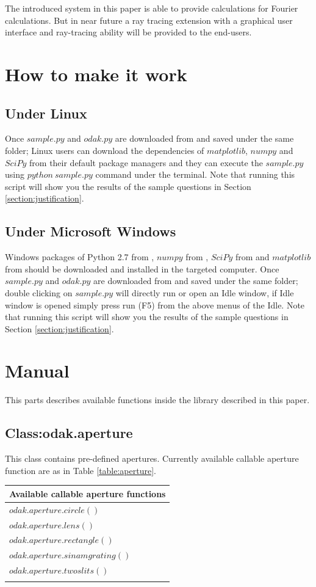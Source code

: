 \documentclass[journal,9pt]{IEEEtran}
\begin{document}
The introduced system in this paper is able to provide calculations for Fourier calculations. But in near future a ray tracing extension with a graphical user interface and ray-tracing ability will be provided to the end-users.

\section{How to make it work}
\label{section:howtomakeitwork}
\subsection{Under Linux}
Once $sample.py$ and $odak.py$ are downloaded from \cite{odak} and saved under the same folder; Linux users can download the dependencies of $matplotlib$, $numpy$ and $SciPy$ from their default package managers and they can execute the $sample.py$ using $python~sample.py$ command under the terminal. Note that running this script will show you the results of the sample questions in Section \ref{section:justification}.
\subsection{Under Microsoft Windows}
Windows packages of Python 2.7 from \cite{python}, $numpy$ from \cite{numpy}, $SciPy$ from \cite{scipy} and $matplotlib$ from \cite{matplotlib} should be downloaded and installed in the targeted computer. Once $sample.py$ and $odak.py$ are downloaded from \cite{odak} and saved under the same folder; double clicking on $sample.py$ will directly run or open an Idle window, if Idle window is opened simply press run (F5) from the above menus of the Idle. Note that running this script will show you the results of the sample questions in Section \ref{section:justification}.

\section{Manual}
\label{section:manual}

This parts describes available functions inside the library described in this paper.
\subsection{Class:odak.aperture}
This class contains pre-defined apertures. Currently available callable aperture function are as in Table \ref{table:aperture}.

\begin{tabular}{ l }
  \\Available callable aperture functions\\ \hline
  $odak.aperture.circle()$\\
  $odak.aperture.lens()$\\
  $odak.aperture.rectangle()$\\
  $odak.aperture.sinamgrating()$\\
  $odak.aperture.twoslits()$\\
\label{table:aperture}
\end{tabular}
\end{document}
